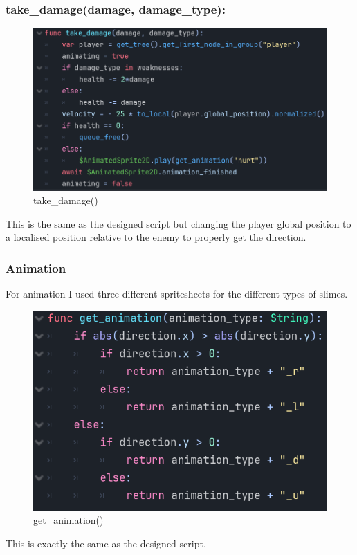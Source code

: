 \documentclass{article}
\begin{document}
        \subsubsection{take\_damage(damage, damage\_type):}
        \begin{figure}[H]
                \centering
                \includegraphics[width = 0.8\columnwidth]{images/development/Enemy_take_damage.PNG}
                \caption{take\_damage()}
        \end{figure}
        This is the same as the designed script but changing the player global position to a localised position relative to the enemy to properly get the direction.\\
        \subsubsection{Animation}
        For animation I used three different spritesheets for the different types of slimes.\\
        \begin{figure}[H]
                \centering
                \includegraphics[width = 0.8\columnwidth]{images/development/Enemy_get_animation.PNG}
                \caption{get\_animation()}
        \end{figure}
        This is exactly the same as the designed script.
\end{document}
